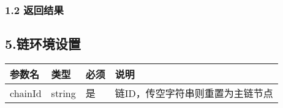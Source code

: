\documentclass[letterpaper,10pt,english]{sphinxmanual}
\begin{document}
\subsubsection{1.2 返回结果}
\label{\detokenize{BCBWalletSDK_u63a5_u53e3_u8bf4_u660e:id11}}

\begin{sphinxVerbatim}[commandchars=\\\{\}]
     
     
        \PYG{o}{[}\PYG{o}{]}
        \PYG{o}{[}\PYG{o}{]}
\end{sphinxVerbatim}


\begin{sphinxVerbatim}[commandchars=\\\{\}]
     
\end{sphinxVerbatim}


\subsection{5.链环境设置}
\label{\detokenize{BCBWalletSDK_u63a5_u53e3_u8bf4_u660e:id12}}


\begin{savenotes}\sphinxattablestart
\centering
\begin{tabulary}{\linewidth}[t]{|T|T|T|T|}
\hline
\sphinxstyletheadfamily 
参数名
&\sphinxstyletheadfamily 
类型
&\sphinxstyletheadfamily 
必须
&\sphinxstyletheadfamily 
说明
\\
\hline
chainId
&
string
&
是
&
链ID，传空字符串则重置为主链节点
\\
\hline
\end{tabulary}
\par
\sphinxattableend\end{savenotes}
\end{document}
